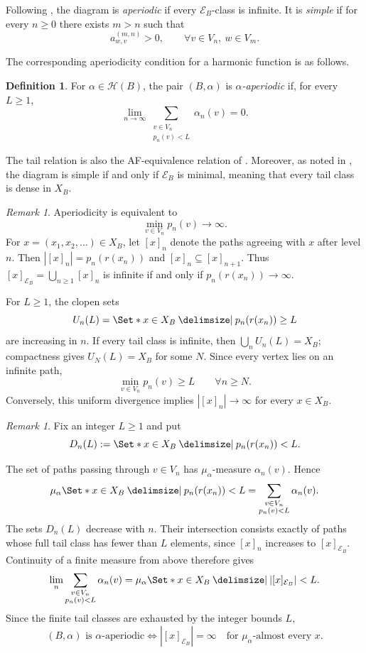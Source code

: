 \documentclass[11pt]{amsart}
\providecommand\given{}
\newcommand\SetSymbol[1][]{%
  \nonscript\:#1\vert\allowbreak\nonscript\:\mathopen{}%
}
\renewcommand\given{\SetSymbol[\delimsize]}#1%
\theoremstyle{definition}
\newtheorem{definition}[theorem]{Definition}
\theoremstyle{remark}
\newtheorem{remark}[theorem]{Remark}
\begin{document}
Following \cite[Section~2.2]{BezuglyiKarpel2016}, the diagram is
\emph{aperiodic} if every $\mathcal E_B$-class is infinite.
It is \emph{simple} if for every $n\geq0$ there exists $m>n$ such that
\[
 a_{w,v}^{(m,n)}>0,
 \qquad \forall v\in V_n,\ w\in V_m.
\]

The corresponding aperiodicity condition for a harmonic function is as follows.

\begin{definition}\label{def:aperiodic}
For $\alpha\in\mathcal H(B)$, the pair $(B,\alpha)$ is
\emph{$\alpha$-aperiodic} if, for every $L\geq1$,
\begin{equation}\label{eq:alpha-aperiodic}
  \lim_{n\to\infty}
  \sum_{\substack{v\in V_n\\p_n(v)<L}}\alpha_n(v)=0.
\end{equation}

\end{definition}

The tail relation is also the AF-equivalence relation of \cite[Definition~3.8
and Proposition~3.9]{Putnam2018}.
Moreover, as noted in \cite[Section~2.2]{BezuglyiKarpel2016}, the diagram is
simple if and only if $\mathcal E_B$ is minimal, meaning that every tail class
is dense in $X_B$.

\begin{remark}
  Aperiodicity is equivalent to
\[
 \min_{v\in V_n}p_n(v)\longrightarrow\infty.
\]
For $x=(x_1,x_2,\ldots)\in X_B$, let $[x]_n$ denote the paths agreeing
with $x$ after level $n$.
Then \(|[x]_n|=p_n(r(x_n))\) and \([x]_n\subseteq[x]_{n+1}\).
Thus $[x]_{\mathcal E_B} =\bigcup_{n\geq1}[x]_n$ is infinite if and only if
$p_n(r(x_n))\to\infty$.

For $L\geq1$, the clopen sets
\[
  U_n(L)=\Set*{ x\in X_B  \given p_n(r(x_n))\geq L  }
\]
are increasing in $n$.  If every tail class is infinite, then
$\bigcup_n U_n(L)=X_B$; compactness gives $U_N(L)=X_B$ for some $N$.
Since every vertex lies on an infinite path,
\[
 \min_{v\in V_n}p_n(v)\geq L\qquad \forall n\geq N.
\]
Conversely, this uniform divergence implies $|[x]_n|\to\infty$ for every
$x\in X_B$.
\end{remark}

\begin{remark}
  Fix an integer $L\geq1$ and put
\[
 D_n(L):=\Set*{x\in X_B\given p_n(r(x_n))<L}.
\]

  The set of paths passing through $v\in V_n$ has
  $\mu_\alpha$-measure $\alpha_n(v)$.
  Hence
\[
  \mu_\alpha\Set*{x\in X_B \given p_n(r(x_n))<L}
  =\sum_{\substack{v\in V_n\\p_n(v)<L}}\alpha_n(v).
\]
The sets $D_n(L)$ decrease with $n$.
Their intersection consists exactly of paths whose full tail class has
fewer than $L$ elements, since $[x]_n$ increases to $[x]_{\mathcal E_B}$.
Continuity of a finite measure from above therefore gives
\[
 \lim_n\sum_{\substack{v\in V_n\\p_n(v)<L}}\alpha_n(v)
 =\mu_\alpha\Set*{x\in X_B\given |[x]_{\mathcal E_B}|<L}.
\]
Since the finite tail classes are exhausted by the integer bounds $L$,
\[
 (B,\alpha)\text{ is }\alpha\text{-aperiodic}
 \iff |[x]_{\mathcal E_B}|=\infty
       \quad\text{for }\mu_\alpha\text{-almost every }x.
\]
\end{remark}
\end{document}

